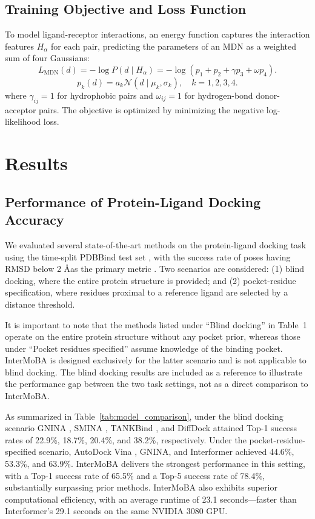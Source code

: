 \documentclass[11pt,a4paper]{article}
\theoremstyle{plain}
\theoremstyle{definition}
\begin{document}
\subsection{Training Objective and Loss Function}
To model ligand-receptor interactions, an energy function captures the interaction features $H_{\alpha}$ for each pair, predicting the parameters of an MDN as a weighted sum of four Gaussians:
\begin{equation}
L_{\text{MDN}}(d) = -\log P(d \mid H_{\alpha}) = -\log(p_1 + p_2 + \gamma p_3 + \omega p_4).
\end{equation}
\begin{equation}
p_k(d) = a_k \mathcal{N}(d \mid \mu_k, \sigma_k), \quad k = 1,2,3,4.
\end{equation}
where $\gamma_{ij}=1$ for hydrophobic pairs and $\omega_{ij}=1$ for hydrogen-bond donor-acceptor pairs. The objective is optimized by minimizing the negative log-likelihood loss.

\section{Results}

\subsection{Performance of Protein-Ligand Docking Accuracy}
We evaluated several state-of-the-art methods on the protein-ligand docking task using the time-split PDBBind test set \cite{wang2005pdbbind}, with the success rate of poses having RMSD below 2 \AA as the primary metric \cite{jain2024deep}. Two scenarios are considered: (1) blind docking, where the entire protein structure is provided; and (2) pocket-residue specification, where residues proximal to a reference ligand are selected by a distance threshold.

It is important to note that the methods listed under ``Blind docking'' in Table~1 operate on the entire protein structure without any pocket prior, whereas those under ``Pocket residues specified'' assume knowledge of the binding pocket. InterMoBA is designed exclusively for the latter scenario and is not applicable to blind docking. The blind docking results are included as a reference to illustrate the performance gap between the two task settings, not as a direct comparison to InterMoBA.

As summarized in Table~\ref{tab:model_comparison}, under the blind docking scenario GNINA \cite{mcnutt2021gnina}, SMINA \cite{koes2013lessons}, TANKBind \cite{lu2022tankbind}, and DiffDock \cite{corso2022diffdock} attained Top-1 success rates of 22.9\%, 18.7\%, 20.4\%, and 38.2\%, respectively. Under the pocket-residue-specified scenario, AutoDock Vina \cite{trott2010autodock}, GNINA, and Interformer \cite{lai2024interformer} achieved 44.6\%, 53.3\%, and 63.9\%. InterMoBA delivers the strongest performance in this setting, with a Top-1 success rate of 65.5\% and a Top-5 success rate of 78.4\%, substantially surpassing prior methods. InterMoBA also exhibits superior computational efficiency, with an average runtime of 23.1 seconds---faster than Interformer's 29.1 seconds on the same NVIDIA 3080 GPU.
\end{document}
